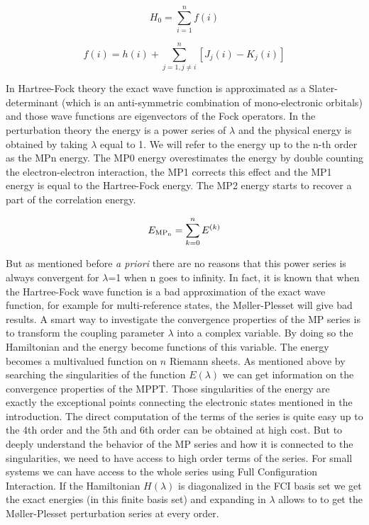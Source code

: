 \documentclass[11pt,a4paper]{article}
\begin{document}
\begin{equation}
H_0= \sum\limits_{i=1}^{n} f(i)
\end{equation}

\begin{equation}
f(i) = h(i) + \sum\limits_{j=1,j \neq i}^{n} \left[J_j(i) - K_j(i)\right]
\end{equation}

In Hartree-Fock theory the exact wave function is approximated as a Slater-determinant (which is an anti-symmetric combination of mono-electronic orbitals) and those wave functions are eigenvectors of the Fock operators. In the perturbation theory the energy is a power series of $\lambda$ and the physical energy is obtained by taking $\lambda$ equal to 1. We will refer to the energy up to the n-th order as the MPn energy. The MP0 energy overestimates the energy by double counting the electron-electron interaction, the MP1 corrects this effect and the MP1 energy is equal to the Hartree-Fock energy. The MP2 energy starts to recover a part of the correlation energy.

\begin{equation}
E_{\text{MP\textsubscript{n}}}= \sum_{k=0}^n E^{(k)}
\end{equation}

But as mentioned before \textit{a priori} there are no reasons that this power series is always convergent for $\lambda$=1 when n goes to infinity. In fact, it is known that when the Hartree-Fock wave function is a bad approximation of the exact wave function, for example for multi-reference states, the M{\o}ller-Plesset will give bad results\cite{Gill_1986, Gill_1988, Handy_1985, Lepetit_1988}. A smart way to investigate the convergence properties of the MP series is to transform the coupling parameter $\lambda$ into a complex variable. By doing so the Hamiltonian and the energy become functions of this variable. The energy becomes a multivalued function on $n$ Riemann sheets. As mentioned above by searching the singularities of the function $E(\lambda)$ we can get information on the convergence properties of the MPPT. Those singularities of the energy are exactly the exceptional points connecting the electronic states mentioned in the introduction. The direct computation of the terms of the series is quite easy up to the 4th order and the 5th and 6th order can be obtained at high cost. But to deeply understand the behavior of the MP series and how it is connected to the singularities, we need to have access to high order terms of the series. For small systems we can have access to the whole series using Full Configuration Interaction. If the Hamiltonian $H(\lambda)$ is diagonalized in the FCI basis set we get the exact energies (in this finite basis set) and expanding in $\lambda$ allows to to get the M{\o}ller-Plesset perturbation series at every order.
\end{document}
